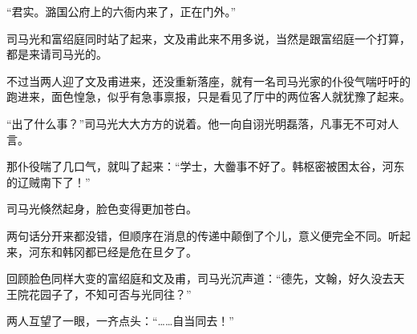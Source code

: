 “君实。潞国公府上的六衙内来了，正在门外。” 

司马光和富绍庭同时站了起来，文及甫此来不用多说，当然是跟富绍庭一个打算，都是来请司马光的。 

不过当两人迎了文及甫进来，还没重新落座，就有一名司马光家的仆役气喘吁吁的跑进来，面色惶急，似乎有急事禀报，只是看见了厅中的两位客人就犹豫了起来。 

“出了什么事？”司马光大大方方的说着。他一向自诩光明磊落，凡事无不可对人言。 

那仆役喘了几口气，就叫了起来：“学士，大齤事不好了。韩枢密被困太谷，河东的辽贼南下了！” 

司马光倏然起身，脸色变得更加苍白。 

两句话分开来都没错，但顺序在消息的传递中颠倒了个儿，意义便完全不同。听起来，河东和韩冈都已经是危在旦夕了。 

回顾脸色同样大变的富绍庭和文及甫，司马光沉声道：“德先，文翰，好久没去天王院花园子了，不知可否与光同往？” 

两人互望了一眼，一齐点头：“……自当同去！”

